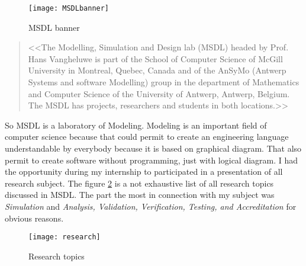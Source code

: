 \begin{figure}[!h]
  \centering
  \texttt{[image: MSDLbanner]}
  \caption{MSDL banner}
  \label{fig:msdl}
\end{figure}


\begin{quotation}
<<The Modelling, Simulation and Design lab (MSDL) headed by Prof. Hans Vangheluwe is part of the School of Computer Science of McGill University in Montreal, Quebec, Canada and of the AnSyMo (Antwerp Systems and software Modelling) group in the department of Mathematics and Computer Science of the University of Antwerp, Antwerp, Belgium. The MSDL has projects, researchers and students in both locations.>>\cite{msdl}
\end{quotation}


So MSDL is a laboratory of Modeling. Modeling is an important field of computer science because that could permit to create an engineering language understandable by everybody because it is based on graphical diagram. That also permit to create software without programming, just with logical diagram. I had the opportunity during my internship to participated in a presentation of all research subject. The figure \ref{fig:subject} is a not exhaustive list of all research topics discussed in MSDL. The part the most in connection with my subject was \textit{Simulation} and \textit{Analysis, Validation, Verification, Testing, and Accreditation} for obvious reasons.


\begin{figure}[h]
  \centering
  \texttt{[image: research]}
  \caption{Research topics}
  \label{fig:subject}
\end{figure}



